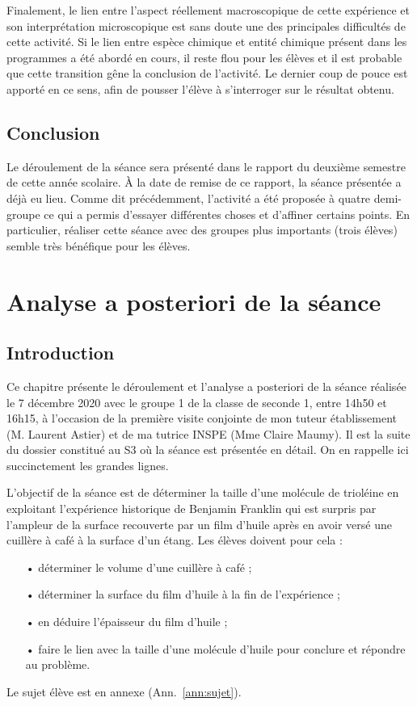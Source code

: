 \documentclass[12pt,a4paper, fleqn]{report}
\begin{document}
Finalement, le lien entre l'aspect réellement macroscopique de cette expérience et son interprétation microscopique est sans doute une des principales difficultés de cette activité.
Si le lien entre espèce chimique et entité chimique présent dans les programmes a été abordé en cours, il reste flou pour les élèves et il est probable que cette transition gêne la conclusion de l'activité.
Le dernier coup de pouce est apporté en ce sens, afin de pousser l'élève à s'interroger sur le résultat obtenu.

\section*{Conclusion}

Le déroulement de la séance sera présenté dans le rapport du deuxième semestre de cette année scolaire.
À la date de remise de ce rapport, la séance présentée a déjà eu lieu.
Comme dit précédemment, l'activité a été proposée à quatre demi-groupe ce qui a permis d'essayer différentes choses et d'affiner certains points.
En particulier, réaliser cette séance avec des groupes plus importants (trois élèves) semble très bénéfique pour les élèves.


\chapter{Analyse a posteriori de la séance}

\section*{Introduction}

Ce chapitre présente le déroulement et l'analyse a posteriori de la séance réalisée le 7 décembre 2020 avec le groupe 1 de la classe de seconde 1, entre 14h50 et 16h15, à l'occasion de la première visite conjointe de mon tuteur établissement (M. Laurent Astier) et de ma tutrice INSPE (Mme Claire Maumy).
Il est la suite du dossier constitué au S3 où la séance est présentée en détail.
On en rappelle ici succinctement les grandes lignes.

L'objectif de la séance est de déterminer la taille d'une molécule de trioléine en exploitant l'expérience historique de Benjamin Franklin qui est surpris par l'ampleur de la surface recouverte par un film d'huile après en avoir versé une cuillère à café à la surface d'un étang.
Les élèves doivent pour cela :
\begin{itemize}
\item[•] déterminer le volume d'une cuillère à café ;
\item[•] déterminer la surface du film d'huile à la fin de l'expérience ;
\item[•] en déduire l'épaisseur du film d'huile ;
\item[•] faire le lien avec la taille d'une molécule d'huile pour conclure et répondre au problème.
\end{itemize}
Le sujet élève est en annexe (Ann.~\ref{ann:sujet}).
\end{document}
